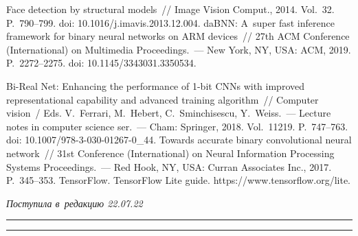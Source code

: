 \begin{multicols}{2}
{{\begin{thebibliography}{99}
 Face detection by structural models~// Image Vision 
Comput., 2014. Vol.~32. P.~790--799. doi: 10.1016/j.imavis.2013.12.004.
 daBNN: A~super fast inference 
framework for binary neural networks on ARM devices~// 27th ACM Conference (International)  
on Multimedia Proceedings.~--- New York, NY, USA: ACM, 2019. P.~2272--2275. doi: 
10.1145/3343031.3350534.

 Bi-Real Net: Enhancing the performance 
of 1-bit CNNs with improved representational capability and advanced training algorithm~// 
Computer vision~/ Eds. V.~Ferrari, M.~Hebert, 
C.~Sminchisescu, Y.~Weiss.~--- Lecture notes in computer science 
ser.~--- Cham: Springer, 2018. Vol.~11219. P.~747--763. doi:  
10.1007/978-3-030-01267-0\_44.
 Towards accurate binary convolutional neural network~// 31st  
Conference (International) on Neural Information Processing Systems Proceedings.~--- Red Hook, 
NY, USA: Curran Associates Inc., 2017. P.~345--353.
TensorFlow. TensorFlow Lite guide. {\sf https://www.\linebreak tensorflow.org/lite}.
\end{thebibliography}

 }
 }

\end{multicols}

\vspace*{-7pt}

\hfill{\small\textit{Поступила в~редакцию 22.07.22}}

\vspace*{6pt}




\hrule

\vspace*{2pt}

\hrule

\vspace*{-2pt}



\def\tit{EFFICIENCY OF~BINARY NEURAL NETWORKS FOR~OBJECT~DETECTION~ON~AN~IMAGE}


\def\titkol{Efficiency of~binary neural networks for~object 
detection on~an~image}


